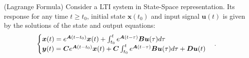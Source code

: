 \documentclass[a4paper,11pt]{book}
\numberwithin{figure}{chapter}
\numberwithin{equation}{chapter}
\numberwithin{table}{chapter}
\newtheorem{theorem}{Theorem}[chapter]
\theoremstyle{definition}
\newcounter{boxed-theorem}
\newenvironment{boxed-theorem}[1]
{\colorlet{shadecolor}{pastelBlue2!10} \begin{shaded} \begin{theorem}{#1}}
{\end{theorem} \end{shaded}}
\newcounter{boxed-definition}
\newcounter{boxed-example}
\begin{document}
\begin{boxed-theorem}{(Lagrange Formula)} \label{th:lagrangeForm}
    Consider a LTI system in State-Space representation. Its response for any time $t \geq t_0$, initial state $\bm{x}(t_0)$ and input signal $\bm{u}(t)$ is given by the solutions of the state and output equations:
    \begin{align}
    \begin{cases}
        \bm{x}(t) = e^{\bm{A}(t - t_0)} \bm{x}(t) + \int_{t_0}^{t} e^{\bm{A}(t - \tau)} \bm{B} \bm{u}(\tau) d \tau \hfill & \\
        \bm{y}(t) = \bm{C} e^{\bm{A}(t - t_0)} \bm{x}(t) + \bm{C} \int_{t_0}^{t} e^{\bm{A}(t - \tau)} \bm{B} \bm{u}(\tau) d \tau + \bm{D} \bm{u}(t) &
    \end{cases}
    .\end{align}
\end{boxed-theorem}
\end{document}
